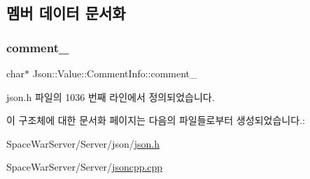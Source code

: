 \subsection{멤버 데이터 문서화}
\mbox{\label{struct_json_1_1_value_1_1_comment_info_a020f19c7098bab8ec8fec14cd1a5afb9}} 
\subsubsection{\texorpdfstring{comment\+\_\+}{comment\_}}
{\footnotesize\ttfamily char$\ast$ Json\+::\+Value\+::\+Comment\+Info\+::comment\+\_\+}



json.\+h 파일의 1036 번째 라인에서 정의되었습니다.



이 구조체에 대한 문서화 페이지는 다음의 파일들로부터 생성되었습니다.\+:\begin{DoxyCompactItemize}
\item 
Space\+War\+Server/\+Server/json/\hyperlink{json_8h}{json.\+h}\item 
Space\+War\+Server/\+Server/\hyperlink{jsoncpp_8cpp}{jsoncpp.\+cpp}\end{DoxyCompactItemize}
